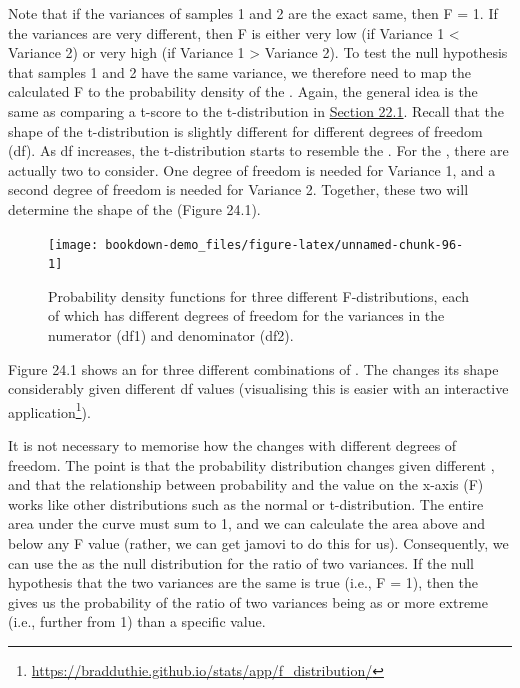 \documentclass[
  openany]{krantz}
\begin{document}
Note that if the variances of samples 1 and 2 are the exact same, then F = 1.
If the variances are very different, then F is either very low (if Variance 1 \textless{} Variance 2) or very high (if Variance 1 \textgreater{} Variance 2).
To test the null hypothesis that samples 1 and 2 have the same variance, we therefore need to map the calculated F to the probability density of the .
Again, the general idea is the same as comparing a t-score to the t-distribution in \protect\hyperlink{one-sample-t-test}{Section 22.1}.
Recall that the shape of the t-distribution is slightly different for different degrees of freedom (df).
As df increases, the t-distribution starts to resemble the .
For the , there are actually two  to consider.
One degree of freedom is needed for Variance 1, and a second degree of freedom is needed for Variance 2.
Together, these two  will determine the shape of the  (Figure 24.1).

\begin{figure}
\texttt{[image: bookdown-demo\_files/figure-latex/unnamed-chunk-96-1]} \caption{Probability density functions for three different F-distributions, each of which has different degrees of freedom for the variances in the numerator (df1) and denominator (df2).}\label{fig:unnamed-chunk-96}
\end{figure}

\newpage

Figure 24.1 shows an  for three different combinations of .
The  changes its shape considerably given different df values (visualising this is easier with an interactive application\footnote{\url{https://bradduthie.github.io/stats/app/f_distribution/}}).

It is not necessary to memorise how the  changes with different degrees of freedom.
The point is that the probability distribution changes given different , and that the relationship between probability and the value on the x-axis (F) works like other distributions such as the normal or t-distribution.
The entire area under the curve must sum to 1, and we can calculate the area above and below any F value (rather, we can get jamovi to do this for us).
Consequently, we can use the  as the null distribution for the ratio of two variances.
If the null hypothesis that the two variances are the same is true (i.e., F = 1), then the  gives us the probability of the ratio of two variances being as or more extreme (i.e., further from 1) than a specific value.
\end{document}
